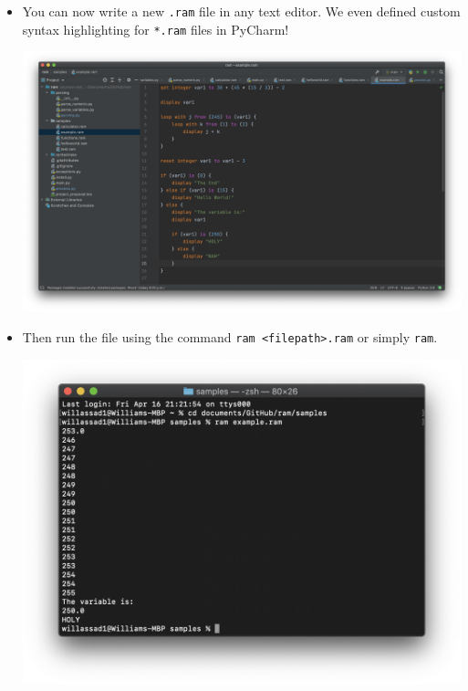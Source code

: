 \documentclass[11pt]{article}
\begin{document}
\begin{itemize}
        \item You can now write a new \texttt{.ram} file in any text editor. We even defined custom syntax highlighting for \texttt{*.ram} files in PyCharm!
            
        \begin{center}
            \includegraphics[scale=0.2]{terminal5.png}
        \end{center}
            
        \item Then run the file using the command \texttt{ram <filepath>.ram} or simply \texttt{ram}.
            
        \begin{center}
            \includegraphics[scale=0.45]{terminal6.png}
        \end{center}
    \end{itemize} 
\end{document}
